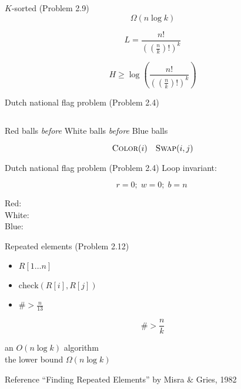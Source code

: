 \begin{frame}{$K$-sorted (Problem 2.9)}
  \[
    \Omega(n \log k)
  \]

  \pause
  \[
	L = \frac{n!}{\left( (\frac{n}{k})! \right)^{k}}
  \]

  \pause
  \[
	H \ge \log \left(\frac{n!}{\left( (\frac{n}{k})! \right)^{k}} \right)
  \]
\end{frame}
\begin{frame}{Dutch national flag problem (Problem 2.4)}
  \begin{columns}
  \end{columns}

  \vspace{0.50cm}
  \centerline{Red balls \emph{before} White balls \emph{before} Blue balls}

  \pause
  \[
	\textsc{Color}(i) \quad \textsc{Swap}(i,j)
  \]
\end{frame}
\begin{frame}{Dutch national flag problem (Problem 2.4)}
  Loop invariant:

  \pause
  \[
    r = 0; \; w = 0; \; b = n\;
  \]

  \vspace{0.30cm}
  \begin{description}
	\item[Red:] 
	\item[White:] 
	\item[Blue:] 
  \end{description}
\end{frame}
\begin{frame}{Repeated elements (Problem 2.12)}
  \begin{itemize}
	\item $R[1 \dots n]$
	\item $\text{check}(R[i], R[j])$
	\item $\# > \frac{n}{13}$
  \end{itemize}

  \pause
  \vspace{0.30cm}

  \[
	\# > \frac{n}{k}
  \]

  \begin{center}
    an $O(n \log k)$ algorithm \\
    the lower bound $\Omega(n \log k)$
  \end{center}

  \begin{alertblock}{Reference}
	``Finding Repeated Elements'' by Misra \& Gries, 1982
  \end{alertblock}
\end{frame}
